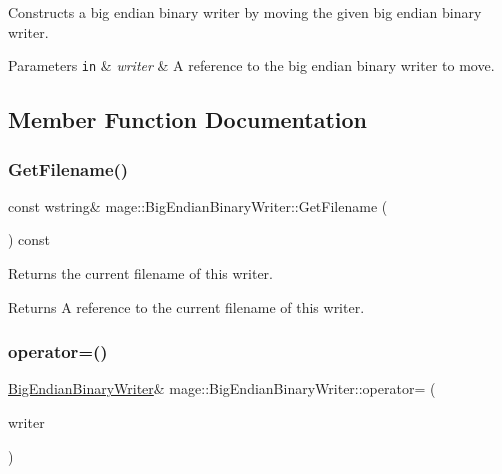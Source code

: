 Constructs a big endian binary writer by moving the given big endian binary writer.


\begin{DoxyParams}[1]{Parameters}
\mbox{\tt in}  & {\em writer} & A reference to the big endian binary writer to move. \\
\hline
\end{DoxyParams}


\subsection{Member Function Documentation}
\hypertarget{classmage_1_1_big_endian_binary_writer_a61a80be19c7b59ff5803e51401e8f646}{}\label{classmage_1_1_big_endian_binary_writer_a61a80be19c7b59ff5803e51401e8f646} 
\subsubsection{\texorpdfstring{Get\+Filename()}{GetFilename()}}
{\footnotesize\ttfamily const wstring\& mage\+::\+Big\+Endian\+Binary\+Writer\+::\+Get\+Filename (\begin{DoxyParamCaption}{ }\end{DoxyParamCaption}) const\hspace{0.3cm}{\ttfamily [noexcept]}}

Returns the current filename of this writer.

\begin{DoxyReturn}{Returns}
A reference to the current filename of this writer. 
\end{DoxyReturn}
\hypertarget{classmage_1_1_big_endian_binary_writer_ae574f7d0b630890256996c52818ba633}{}\label{classmage_1_1_big_endian_binary_writer_ae574f7d0b630890256996c52818ba633} 
\subsubsection{\texorpdfstring{operator=()}{operator=()}\hspace{0.1cm}{\footnotesize\ttfamily [1/2]}}
{\footnotesize\ttfamily \hyperlink{classmage_1_1_big_endian_binary_writer}{Big\+Endian\+Binary\+Writer}\& mage\+::\+Big\+Endian\+Binary\+Writer\+::operator= (\begin{DoxyParamCaption}\item[{const \hyperlink{classmage_1_1_big_endian_binary_writer}{Big\+Endian\+Binary\+Writer} \&}]{writer }\end{DoxyParamCaption})\hspace{0.3cm}{\ttfamily [delete]}}

